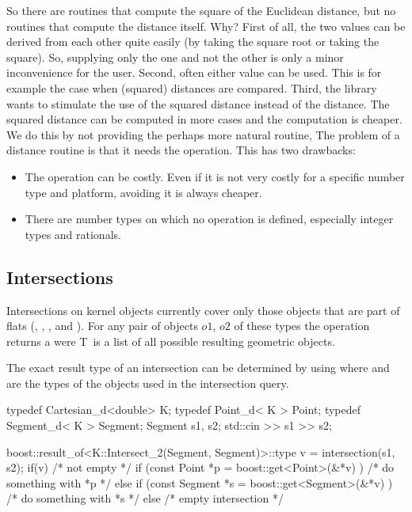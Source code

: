So there are routines that compute the square of the Euclidean
distance, but no routines that compute the distance itself. Why?
First of all, the two values can be derived from each other quite
easily (by taking the square root or taking the square). So, supplying
only the one and not the other is only a minor inconvenience for the
user.  Second, often either value can be used. This is for example the
case when (squared) distances are compared.  Third, the library wants
to stimulate the use of the squared distance instead of the distance.
The squared distance can be computed in more cases and the computation
is cheaper.  We do this by not providing the perhaps more natural
routine, The problem of a distance routine is that it needs the
 operation.  This has two drawbacks:
\begin{itemize}
\item The  operation can be costly. Even if it is not
  very costly for a specific number type and platform, avoiding it is
  always cheaper.
\item There are number types on which no  operation is
  defined, especially integer types and rationals.
\end{itemize}

\subsection{Intersections}

Intersections on kernel objects currently cover only those objects
that are part of flats (, ,
, and ).  For any pair of objects
$o1$, $o2$ of these types the operation 
returns a 
were T\textellipsis\ is a list of all possible resulting geometric objects.

The exact result type of an intersection can be determined by using
where  and  are the types of the objects
used in the intersection query.

\ccExample 
\ccHtmlLinksOff%
\begin{cprog}
  typedef Cartesian_d<double> K;
  typedef Point_d< K >        Point;
  typedef Segment_d< K >      Segment;
  Segment s1, s2;
  std::cin >> s1 >> s2;

  boost::result_of<K::Intersect_2(Segment, Segment)>::type
    v = intersection(s1, s2);
  if(v) {
    /* not empty */
    if (const Point *p = boost::get<Point>(&*v) ) {
      /* do something with *p */
    } else if (const Segment *s = boost::get<Segment>(&*v) ) {
      /* do something with *s */
    }
  } else {
    /* empty intersection */
  }
\end{cprog}
\ccHtmlLinksOn%

